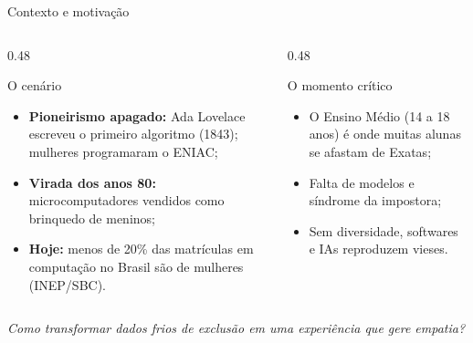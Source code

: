 \documentclass[aspectratio=169, 10pt, t]{beamer}
\begin{document}
\begin{frame}{Contexto e motivação}
  \begin{columns}[T]
    \begin{column}{0.48\textwidth}
      \begin{card}{O cenário}
        \begin{itemize}
          \item \textbf{Pioneirismo apagado:} Ada Lovelace escreveu o primeiro algoritmo (1843); mulheres programaram o ENIAC;
          \item \textbf{Virada dos anos 80:} microcomputadores vendidos como brinquedo de meninos;
          \item \textbf{Hoje:} menos de 20\% das matrículas em computação no Brasil são de mulheres (INEP/SBC).
        \end{itemize}
      \end{card}
    \end{column}
    \begin{column}{0.48\textwidth}
      \begin{card}{O momento crítico}
        \begin{itemize}
          \item O Ensino Médio (14 a 18 anos) é onde muitas alunas se afastam de Exatas;
          \item Falta de modelos e síndrome da impostora;
          \item Sem diversidade, softwares e IAs reproduzem vieses.
        \end{itemize}
      \end{card}
    \end{column}
  \end{columns}
  \vspace{0.3em}
  \begin{center}{\titlefont\itshape\normalsize\color{Cyan}Como transformar dados frios de exclusão em uma experiência que gere empatia?}\end{center}
\end{frame}
\end{document}
